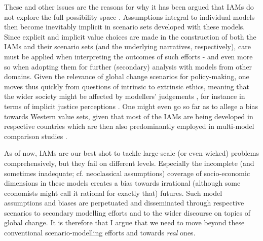 These and other issues are the reasons for why it has been argued that IAMs do not explore the full possibility space \parencite{keppo_2021,mccollum_2020, gambhir_2022}. Assumptions integral to individual models then become inevitably implicit in scenario sets developed with these models. Since explicit and implicit value choices are made in the construction of both the IAMs and their scenario sets (and the underlying narratives, respectively), care must be applied when interpreting the outcomes of such efforts \parencite[even if it is only reference scenarios; see e.g.][]{grant_2020} - and even more so when adopting them for further (secondary) analysis with models from other domains. Given the relevance of global change scenarios for policy-making, one moves thus quickly from questions of intrinsic to extrinsic ethics, meaning that the wider society might be affected by modellers' judgements \parencite{beck_2016},\footnotemark{} for instance in terms of implicit justice perceptions \parencite{rubiano_2022}. One might even go so far as to allege a bias towards Western value sets, given that most of the IAMs are being developed in respective countries which are then also predominantly employed in multi-model comparison studies \parencite{duan_2019}.


As of now, IAMs are our best shot to tackle large-scale (or even wicked) problems comprehensively, but they fail on different levels. Especially the incomplete (and sometimes inadequate; cf. neoclassical assumptions) coverage of socio-economic dimensions in these models creates a bias towards irrational (although some economists might call it rational for exactly that) futures. Such model assumptions and biases are perpetuated and disseminated through respective scenarios to secondary modelling efforts and to the wider discourse on topics of global change. It is therefore that I argue that we need to move beyond these conventional scenario-modelling efforts and towards \textit{real} ones.